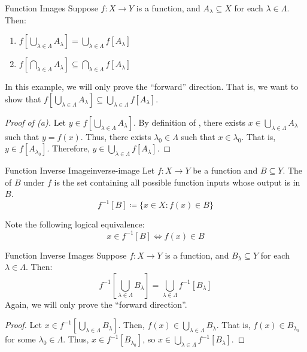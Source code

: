 \documentclass[12pt]{report}
\begin{document}
\begin{exbox}{Function Images}{}
    Suppose $f : X \to Y$ is a function, and $A_\lambda \subseteq X$ for each $\lambda \in \Lambda$. Then:
    \begin{enumerate}[label=(\alph*)]
        \item $f \left[ \bigcup_{\lambda \in \Lambda} A_\lambda \right] = \bigcup_{\lambda \in \Lambda} f \left[ A_\lambda \right]$
        \item $f \left[ \bigcap_{\lambda \in \Lambda} A_\lambda \right] \subseteq \bigcap_{\lambda \in \Lambda} f \left[ A_\lambda \right]$
    \end{enumerate}
    \tcblower
    In this example, we will only prove the ``forward'' direction. That is, we want to show that $f \left[ \bigcup_{\lambda \in \Lambda} A_\lambda \right] \subseteq \bigcup_{\lambda \in \Lambda} f \left[ A_\lambda \right]$.
    \begin{proof}[Proof of (a)]
        Let $y \in f \left[ \bigcup_{\lambda \in \Lambda} A_\lambda \right]$. By definition of , there exists $x \in \bigcup_{\lambda \in \Lambda} A_\lambda$ such that $y = f(x)$. Thus, there exists $\lambda_0 \in \Lambda$ such that $x \in \lambda_0$. That is, $y \in f \left[ A_{\lambda_0} \right]$. Therefore, $y \in \bigcup_{\lambda \in \Lambda} f \left[ A_\lambda \right]$.
    \end{proof}
\end{exbox}

\begin{dfnbox}{Function Inverse Image}{inverse-image}
    Let $f : X \to Y$ be a function and $B \subseteq Y$. The  of $B$ under $f$ is the set containing all possible function inputs whose output is in $B$.
    \tcblower
    \[ f^{-1}[B] \coloneq \{ x \in X: f(x) \in B \} \]
\end{dfnbox}

Note the following logical equivalence:
\[ x \in f^{-1} [B] \iff f(x) \in B \]

\begin{exbox}{Function Inverse Images}{}
    Suppose $f : X \to Y$ is a function, and $B_\lambda \subseteq Y$ for each $\lambda \in \Lambda$. Then:
    \[ f^{-1} \left[ \bigcup_{\lambda \in \Lambda} B_\lambda \right] = \bigcup_{\lambda \in \Lambda} f^{-1} \left[ B_\lambda \right] \]
    \tcblower
    Again, we will only prove the ``forward direction''.
    \begin{proof}
        Let $x \in f^{-1} \left[ \bigcup_{\lambda \in \Lambda} B_\lambda \right]$. Then, $f(x) \in \bigcup_{\lambda \in \Lambda} B_\lambda$. That is, $f(x) \in B_{\lambda_0}$ for some $\lambda_0 \in \Lambda$. Thus, $x \in f^{-1} \left[ B_{\lambda_0} \right]$, so $x \in \bigcup_{\lambda \in \Lambda} f^{-1} \left[ B_\lambda \right]$.
    \end{proof}
\end{exbox}
\end{document}
